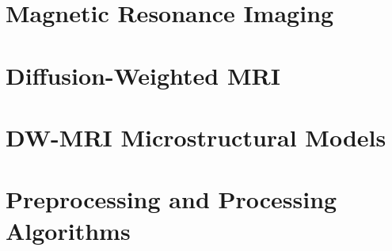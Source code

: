 \section{Magnetic Resonance Imaging}

\section{Diffusion-Weighted MRI}

\section{DW-MRI Microstructural Models}

\section{Preprocessing and Processing Algorithms}